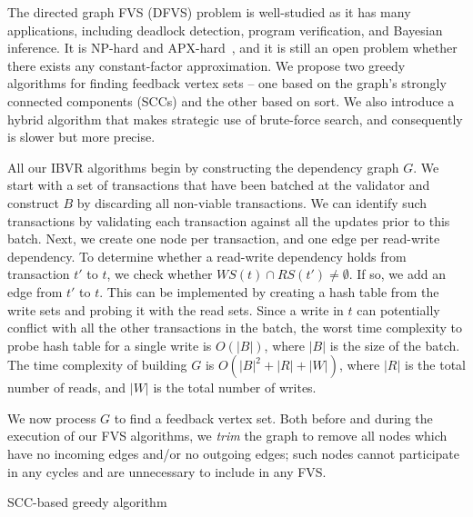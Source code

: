 The directed graph FVS (DFVS) problem is well-studied as it has many applications, including deadlock detection, program verification, and Bayesian inference. It is NP-hard and APX-hard~\cite{kann1992approximability, karp1972reducibility}, and it is still an open problem whether there exists any constant-factor approximation.
We propose two greedy algorithms for finding feedback vertex sets -- one based on the graph's strongly connected components (SCCs) and the other based on sort. We also introduce a hybrid algorithm that makes strategic use of brute-force search, and consequently is slower but more precise.

All our IBVR algorithms begin by constructing the dependency graph $G$. We start with a set of transactions that have been batched at the validator and construct $B$ by discarding all non-viable transactions. We can identify such transactions by validating each transaction against all the updates prior to this batch.
Next, we create one node per transaction, and one edge per read-write dependency. To determine whether a read-write dependency holds from transaction $t'$ to $t$, we check whether $WS(t) \cap RS(t') \neq \emptyset$. If so, we add an edge from $t'$ to $t$. This can be implemented by creating a hash table from the write sets and probing it with the read sets. Since a write in $t$ can potentially conflict with all the other transactions in the batch, the worst time complexity to probe hash table for a single write is $O(|B|)$, where $|B|$ is the size of the batch. The time complexity of building $G$ is $O(|B|^2+|R|+|W|)$, where $|R|$ is the total number of reads, and $|W|$ is the total number of writes. 

We now process $G$ to find a feedback vertex set. Both before and during the execution of our FVS algorithms, we \emph{trim} the graph to remove all nodes which have no incoming edges and/or no outgoing edges; such nodes cannot participate in any cycles and are unnecessary to include in any FVS.

\begin{algorithm}[t]
\SetAlgoLined\DontPrintSemicolon
{}


\caption{SCC-based greedy algorithm}
\label{alg:scc}
\end{algorithm}


